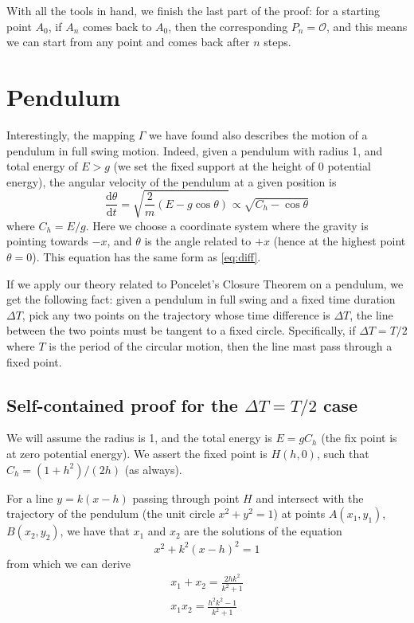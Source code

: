 \documentclass[]{article}
\newcommand{\ud}{\mathrm{d}}
\begin{document}
With all the tools in hand, we finish the last part of the proof: for a starting point $A_0$, if $A_n$ comes back to $A_0$, then the corresponding $P_n = \mathcal{O}$, and this means we can start from any point and comes back after $n$ steps.

\section{Pendulum}

Interestingly, the mapping $\Gamma$ we have found also describes the motion of a pendulum in full swing motion. Indeed, given a pendulum with radius 1, and total energy of $E > g$ (we set the fixed support at the height of 0 potential energy), the angular velocity of the pendulum at a given position is
\[
\frac{\ud\theta}{\ud t} = \sqrt{\frac{2}{m}(E - g\cos\theta)} \propto \sqrt{C_h - \cos\theta}
\]
where $C_h = E/g$. Here we choose a coordinate system where the gravity is pointing towards $-x$, and $\theta$ is the angle related to $+x$ (hence at the highest point $\theta = 0$). This equation has the same form as \eqref{eq:diff}.

If we apply our theory related to Poncelet's Closure Theorem on a pendulum, we get the following fact: given a pendulum in full swing and a fixed time duration $\Delta T$, pick any two points on the trajectory whose time difference is $\Delta T$, the line between the two points must be tangent to a fixed circle. Specifically, if $\Delta T = T/2$ where $T$ is the period of the circular motion, then the line mast pass through a fixed point.

\subsection{Self-contained proof for the $\Delta T = T/2$ case}

We will assume the radius is 1, and the total energy is $E = g C_h$ (the fix point is at zero potential energy). We assert the fixed point is $H(h, 0)$, such that $C_h = (1+h^2)/(2h)$ (as always).

For a line $y = k(x-h) $ passing through point $H$ and intersect with the trajectory of the pendulum (the unit circle $x^2 + y^2 = 1$) at points $A(x_1, y_1)$, $B(x_2, y_2)$, we have that $x_1$ and $x_2$ are the solutions of the equation
\[
x^2 +k^2(x-h)^2=1
\]
from which we can derive
\begin{align*}
x_1+x_2 = \frac{2hk^2}{k^2+1}\\
x_1x_2 = \frac{h^2k^2-1}{k^2+1}
\end{align*}
\end{document}
